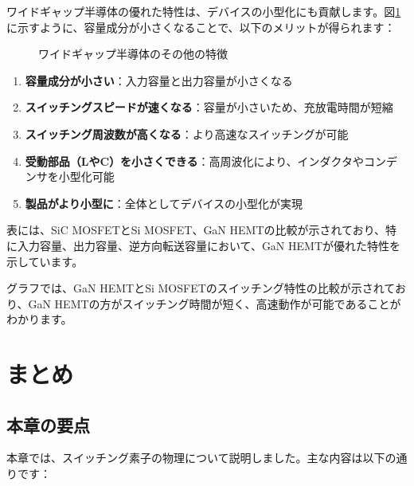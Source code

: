 ワイドギャップ半導体の優れた特性は、デバイスの小型化にも貢献します。図\ref{fig:widegap_features}に示すように、容量成分が小さくなることで、以下のメリットが得られます：

\begin{figure}[H]
\centering
{}
\caption{ワイドギャップ半導体のその他の特徴}
\label{fig:widegap_features}
\end{figure}

\begin{enumerate}
\item \textbf{容量成分が小さい}：入力容量と出力容量が小さくなる
\item \textbf{スイッチングスピードが速くなる}：容量が小さいため、充放電時間が短縮
\item \textbf{スイッチング周波数が高くなる}：より高速なスイッチングが可能
\item \textbf{受動部品（LやC）を小さくできる}：高周波化により、インダクタやコンデンサを小型化可能
\item \textbf{製品がより小型に}：全体としてデバイスの小型化が実現
\end{enumerate}

表には、SiC MOSFETとSi MOSFET、GaN HEMTの比較が示されており、特に入力容量、出力容量、逆方向転送容量において、GaN HEMTが優れた特性を示しています。

グラフでは、GaN HEMTとSi MOSFETのスイッチング特性の比較が示されており、GaN HEMTの方がスイッチング時間が短く、高速動作が可能であることがわかります。

\section{まとめ}

\subsection{本章の要点}

本章では、スイッチング素子の物理について説明しました。主な内容は以下の通りです：

